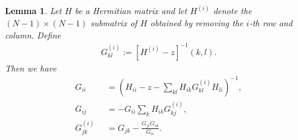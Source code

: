 \documentclass[10pt,reqno]{article}
\theoremstyle{plain} %
\newtheorem{lemma}[theorem]{Lemma}
\theoremstyle{remark}
\numberwithin{equation}{section}
\begin{document}
\begin{lemma} Let $H$ be a Hermitian matrix and let $H^{(i)}$ denote the $ (N-1)\times(N-1)$ submatrix of $H$ obtained by removing the $i$-th row and column. Define
\begin{align}\label{def_G(i)}
 G_{kl}^{(i)}:=\left[H^{(i)}-z\right]^{-1}(k,l). 
 \end{align}
Then we have 
\begin{align}\label{GiiSCP}
    G_{ii} &\;\;= \left(H_{ii}-z-\sum_{kl}H_{ik}G^{(i)}_{kl}H_{li}\right)^{-1},
    \\\label{GijSCP2}
   G_{ij} &\;\;= -G_{ii} \sum_{k}H_{ik}G^{(i )}_{kj},
\\\label{GijkSCP}
   G^{(i)}_{jk} &\;\;= G_{jk}-\frac{G_{ji}G_{ik}}{G_{ii}} .
   \end{align}
\end{lemma}
\end{document}
